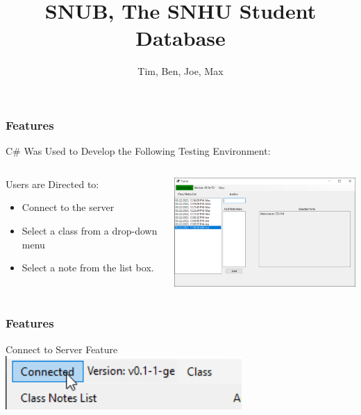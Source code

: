 \documentclass[aspectratio=169]{beamer}
\title{SNUB, The SNHU Student Database}
\author{Tim, Ben, Joe, Max}
\institute{SNHU CS-114}
\begin{document}
\frame{\titlepage} %

\begin{frame}
    \frametitle{Features}

    
    \begin{block}{\centering C\# Was Used to Develop the Following Testing Environment:}
    \end{block}
    \begin{columns}
        \begin{column}{0.3\textwidth}
            \begin{block}{Users are Directed to:}
            \begin{itemize}
                \item Connect to the server
                \item Select a class from a drop-down menu
                \item Select a note from the list box.
            \end{itemize}
            \end{block}
        \end{column}
        \begin{column}{0.48\textwidth}
            \includegraphics[width=8cm]{Sample_of_Features}
        \end{column}
    \end{columns}

\end{frame}

\begin{frame}
    \frametitle{Features}

    \begin{block}{\centering Connect to Server Feature}
        \centering \includegraphics [width=9cm] {connect}
    \end{block}
\end{frame}
\end{document}
